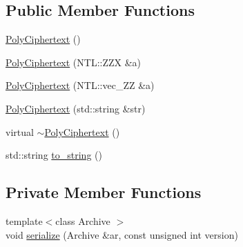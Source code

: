 \subsection*{Public Member Functions}
\begin{DoxyCompactItemize}
\item 
\hyperlink{classPolyCiphertext_ae081c8472f7ec80bea8793401b605436}{Poly\+Ciphertext} ()
\item 
\hyperlink{classPolyCiphertext_a48360be9981b6b84eb48be372bb3296a}{Poly\+Ciphertext} (N\+T\+L\+::\+Z\+ZX \&a)
\item 
\hyperlink{classPolyCiphertext_a4dc4594b14dee8e42ac35537506fb0fd}{Poly\+Ciphertext} (N\+T\+L\+::vec\+\_\+\+ZZ \&a)
\item 
\hyperlink{classPolyCiphertext_ad46cd9f5dfa2313798e5302f7d7a9445}{Poly\+Ciphertext} (std\+::string \&str)
\item 
virtual \hyperlink{classPolyCiphertext_aeee18e28294a2cac4e95fcc704026673}{$\sim$\+Poly\+Ciphertext} ()
\item 
std\+::string \hyperlink{classPolyCiphertext_a4ffc33808a07305df76a26a0fdc60d8e}{to\+\_\+string} ()
\end{DoxyCompactItemize}
\subsection*{Private Member Functions}
\begin{DoxyCompactItemize}
\item 
{\footnotesize template$<$class Archive $>$ }\\void \hyperlink{classPolyCiphertext_a6405ebc8f6ad048239ea6f8d677702af}{serialize} (Archive \&ar, const unsigned int version)
\end{DoxyCompactItemize}
